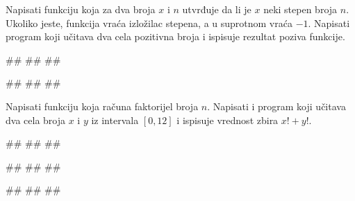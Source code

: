\begin{Exercise}[label=v1.4_11] 
Napisati funkciju  koja
za dva broja $x$ i $n$ utvrđuje da li je $x$ neki stepen broja
$n$. Ukoliko jeste, funkcija vraća izložilac stepena, a u suprotnom
vraća $-1$. Napisati program koji učitava dva cela pozitivna broja i
ispisuje rezultat poziva funkcije. 

\begin{miditest}
\begin{upotreba}{1}
#\naslovInt#
##
##
\end{upotreba}
\end{miditest}
\begin{miditest}
\begin{upotreba}{2}
#\naslovInt#
##
##
\end{upotreba}
\end{miditest}

\end{Exercise}
\begin{Answer}[ref=v1.4_11]
\end{Answer}


\begin{Exercise}[label=p1.4_13] 
Napisati funkciju  koja računa faktorijel
broja $n$. Napisati i program koji učitava dva cela broja $x$ i $y$ iz
intervala $[0,12]$ i ispisuje vrednost zbira $x!+y!$.
 
\begin{miditest}
\begin{upotreba}{1}
#\naslovInt#
##
##
\end{upotreba}
\end{miditest}
\begin{miditest}
\begin{upotreba}{2}
#\naslovInt#
##
##
\end{upotreba}
\end{miditest}

\begin{miditest}
\begin{upotreba}{3}
#\naslovInt#
##
##
\end{upotreba}
\end{miditest}

\end{Exercise}
\begin{Answer}[ref=p1.4_13]
\end{Answer}


